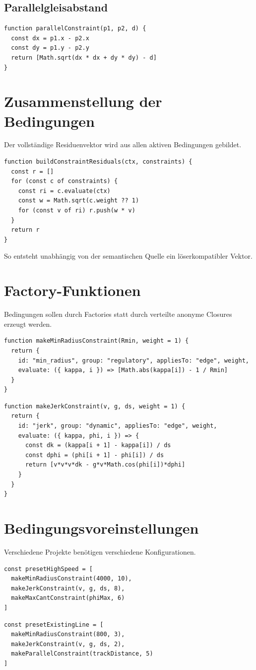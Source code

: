 \subsection{Parallelgleisabstand}
\begin{verbatim}
function parallelConstraint(p1, p2, d) {
  const dx = p1.x - p2.x
  const dy = p1.y - p2.y
  return [Math.sqrt(dx * dx + dy * dy) - d]
}
\end{verbatim}

\section{Zusammenstellung der Bedingungen}
Der vollständige Residuenvektor wird aus allen aktiven Bedingungen gebildet.
\begin{verbatim}
function buildConstraintResiduals(ctx, constraints) {
  const r = []
  for (const c of constraints) {
    const ri = c.evaluate(ctx)
    const w = Math.sqrt(c.weight ?? 1)
    for (const v of ri) r.push(w * v)
  }
  return r
}
\end{verbatim}
So entsteht unabhängig von der semantischen Quelle ein löserkompatibler Vektor.

\section{Factory-Funktionen}
Bedingungen sollen durch Factories statt durch verteilte anonyme Closures
erzeugt werden.
\begin{verbatim}
function makeMinRadiusConstraint(Rmin, weight = 1) {
  return {
    id: "min_radius", group: "regulatory", appliesTo: "edge", weight,
    evaluate: ({ kappa, i }) => [Math.abs(kappa[i]) - 1 / Rmin]
  }
}
\end{verbatim}
\begin{verbatim}
function makeJerkConstraint(v, g, ds, weight = 1) {
  return {
    id: "jerk", group: "dynamic", appliesTo: "edge", weight,
    evaluate: ({ kappa, phi, i }) => {
      const dk = (kappa[i + 1] - kappa[i]) / ds
      const dphi = (phi[i + 1] - phi[i]) / ds
      return [v*v*v*dk - g*v*Math.cos(phi[i])*dphi]
    }
  }
}
\end{verbatim}

\section{Bedingungsvoreinstellungen}
Verschiedene Projekte benötigen verschiedene Konfigurationen.
\begin{verbatim}
const presetHighSpeed = [
  makeMinRadiusConstraint(4000, 10),
  makeJerkConstraint(v, g, ds, 8),
  makeMaxCantConstraint(phiMax, 6)
]
\end{verbatim}
\begin{verbatim}
const presetExistingLine = [
  makeMinRadiusConstraint(800, 3),
  makeJerkConstraint(v, g, ds, 2),
  makeParallelConstraint(trackDistance, 5)
]
\end{verbatim}

